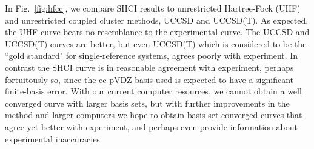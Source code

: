 
In Fig.~\ref{fig:hfcc}, we compare SHCI results to unrestricted Hartree-Fock (UHF) and unrestricted coupled cluster methods, UCCSD and UCCSD(T).
As expected, the UHF curve bears no resemblance to the experimental curve.
The UCCSD and UCCSD(T) curves are better, but even UCCSD(T) which is considered to be the ``gold standard" for single-reference
systems, agrees poorly with experiment.  In contrast the SHCI curve is in reasonable agreement with experiment, perhaps
fortuitously so, since the cc-pVDZ basis used is expected to have a significant finite-basis error.
With our current computer resources, we cannot obtain a well converged curve with larger basis sets,
but with further improvements in the method and larger computers we hope to obtain basis set converged curves
that agree yet better with experiment, and perhaps even provide information about experimental inaccuracies.

